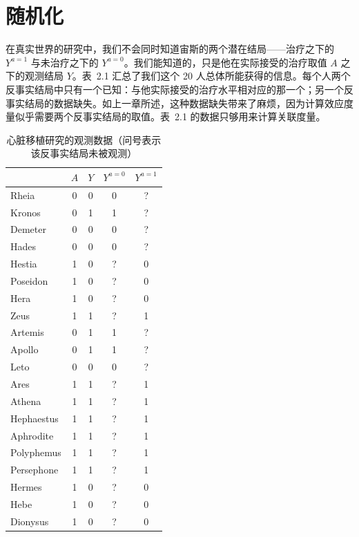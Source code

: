 \section{随机化}

在真实世界的研究中，我们不会同时知道宙斯的两个潜在结局——治疗之下的 $Y^{a=1}$ 与未治疗之下的 $Y^{a=0}$。我们能知道的，只是他在实际接受的治疗取值 $A$ 之下的观测结局 $Y$。表~2.1 汇总了我们这个 20 人总体所能获得的信息。每个人两个反事实结局中只有一个已知：与他实际接受的治疗水平相对应的那一个；另一个反事实结局的数据缺失。如上一章所述，这种数据缺失带来了麻烦，因为计算效应度量似乎需要两个反事实结局的取值。表~2.1 的数据只够用来计算关联度量。


\begin{table}[t]
\centering
\caption{心脏移植研究的观测数据（问号表示该反事实结局未被观测）}
\label{tab:2.1}
\small
\begin{tabular}{lcccc}
\toprule
& $A$ & $Y$ & $Y^{a=0}$ & $Y^{a=1}$\\
\midrule
Rheia      & 0 & 0 & 0 & ?\\
Kronos     & 0 & 1 & 1 & ?\\
Demeter    & 0 & 0 & 0 & ?\\
Hades      & 0 & 0 & 0 & ?\\
Hestia     & 1 & 0 & ? & 0\\
Poseidon   & 1 & 0 & ? & 0\\
Hera       & 1 & 0 & ? & 0\\
Zeus       & 1 & 1 & ? & 1\\
Artemis    & 0 & 1 & 1 & ?\\
Apollo     & 0 & 1 & 1 & ?\\
Leto       & 0 & 0 & 0 & ?\\
Ares       & 1 & 1 & ? & 1\\
Athena     & 1 & 1 & ? & 1\\
Hephaestus & 1 & 1 & ? & 1\\
Aphrodite  & 1 & 1 & ? & 1\\
Polyphemus & 1 & 1 & ? & 1\\
Persephone & 1 & 1 & ? & 1\\
Hermes     & 1 & 0 & ? & 0\\
Hebe       & 1 & 0 & ? & 0\\
Dionysus   & 1 & 0 & ? & 0\\
\bottomrule
\end{tabular}
\end{table}

